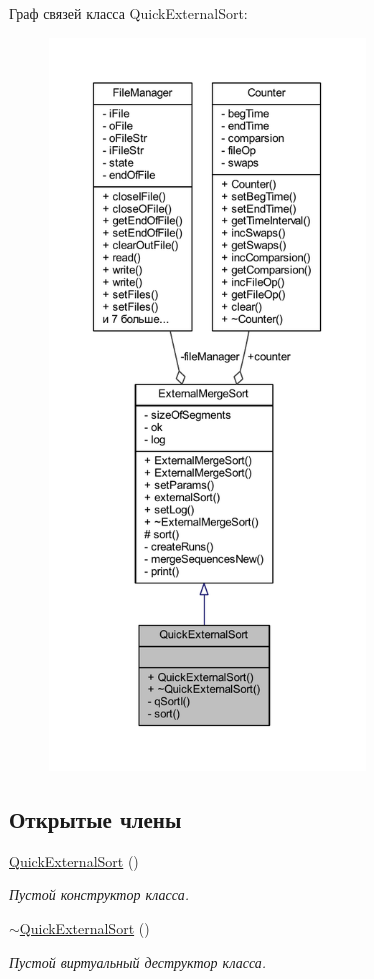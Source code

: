 Граф связей класса Quick\+External\+Sort\+:\nopagebreak
\begin{figure}[H]
\begin{center}
\leavevmode
\includegraphics[height=550pt]{class_quick_external_sort__coll__graph}
\end{center}
\end{figure}
\subsection*{Открытые члены}
\begin{DoxyCompactItemize}
\item 
\hyperlink{class_quick_external_sort_ac31914e67af41c48b8fdcbcc076168ed}{Quick\+External\+Sort} ()
\begin{DoxyCompactList}\small\item\em Пустой конструктор класса. \end{DoxyCompactList}\item 
\hyperlink{class_quick_external_sort_a370e2be5e7c4afc31f9b230c2ee4d689}{$\sim$\+Quick\+External\+Sort} ()
\begin{DoxyCompactList}\small\item\em Пустой виртуальный деструктор класса. \end{DoxyCompactList}\end{DoxyCompactItemize}
